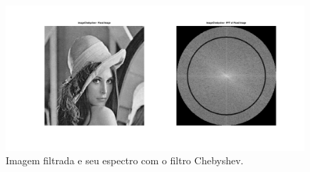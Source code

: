 \begin{figure}[H]
    \centering
    \includegraphics[width=1\linewidth]{03_results/assets/image_chebyshev.png}
    \caption{Imagem filtrada e seu espectro com o filtro Chebyshev.}
    \label{fig:image_chebyshev}
\end{figure}
